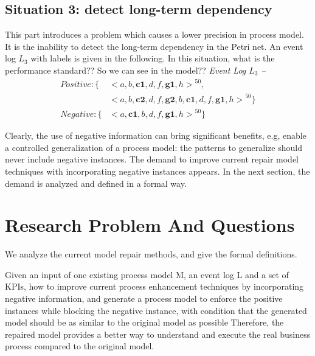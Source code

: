 \subsection{Situation 3: \small{detect long-term dependency}}
This part introduces a problem which causes a lower precision in process model. It is the inability to detect the long-term dependency in the Petri net. 
An event log $L_3$ with labels is given in the following. In this situation,  what is the performance standard?? So we can see in the model?? 
\emph{Event Log $L_3$ -- }
\begin{align*}
Positive:\{ & { <a,b,\textbf{c1},d,f,\textbf{g1},h>}^{50}, \\   &{<a,b,\textbf{c2},d,f,\textbf{g2},b, \textbf{c1},d,f,\textbf{g1},h>}^{50} \}  \\
Negative: \{ %
& {<a,\textbf{c1},b,d,f,\textbf{g1},h>}^{50}  \}
\end{align*}


Clearly, the use of negative information can bring significant benefits, e.g, enable a controlled generalization of a process model: the patterns to generalize should never include negative instances. The demand to improve current repair model techniques with incorporating negative instances appears. In the next section, the demand is analyzed and defined in a formal way.

\section{Research Problem And Questions}
We analyze the current model repair methods, and give the formal definitions.
\begin{definition}
Given an input of one existing process model M, an event log L and a set of KPIs, how  to improve current process enhancement techniques by incorporating negative information, and generate a process model to enforce the positive instances while blocking the negative instance, with condition that the generated model should be as similar to the original model as possible Therefore, the repaired model provides a better way to understand and execute the real business process compared to the original model.
\end{definition}


